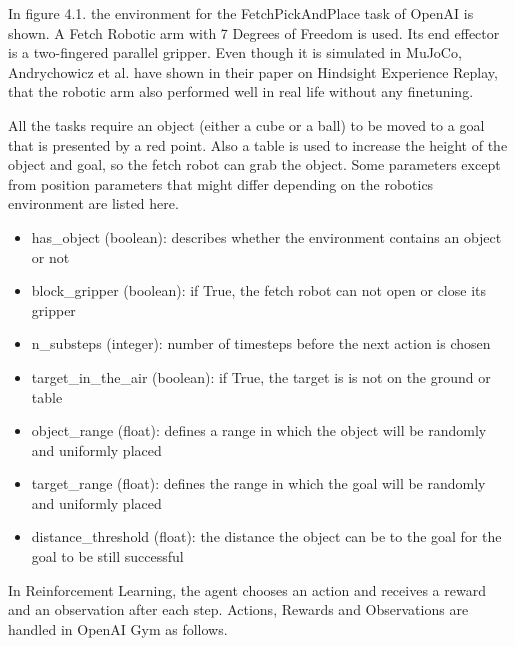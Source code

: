 \vspace{0.5cm}

In figure 4.1. the environment for the FetchPickAndPlace task of OpenAI is shown. A Fetch Robotic arm with 7 Degrees of Freedom is used. Its end effector is a two-fingered parallel gripper. Even though it is simulated in MuJoCo, Andrychowicz et al. have shown in their paper on Hindsight Experience Replay, that the robotic arm also performed well in real life without any finetuning. 

\vspace{0.5cm}

All the tasks require an object (either a cube or a ball) to be moved to a goal that is presented by a red point. Also a table is used to increase the height of the object and goal, so the fetch robot can grab the object.
Some parameters except from position parameters that might differ depending on the robotics environment are listed here.

\begin{itemize}
	\item has\_object (boolean): describes whether the environment contains an object or not
	\item block\_gripper (boolean): if True, the fetch robot can not open or close its gripper
	\item n\_substeps (integer): number of timesteps before the next action is chosen
	\item target\_in\_the\_air (boolean): if True, the target is is not on the ground or table 
	\item object\_range (float): defines a range in which the object will be randomly and uniformly placed
	\item target\_range (float): defines the range in which the goal will be randomly and uniformly placed
	\item distance\_threshold (float): the distance the object can be to the goal for the goal to be still successful 
\end{itemize}

In Reinforcement Learning, the agent chooses an action and receives a reward and an observation after each step. Actions, Rewards and Observations are handled in OpenAI Gym as follows.

